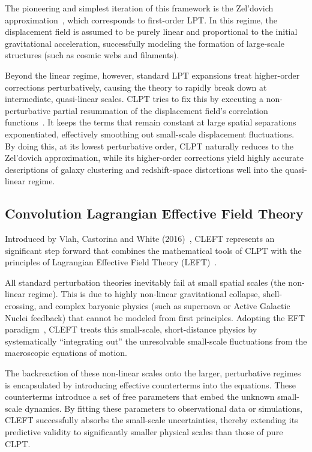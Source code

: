\documentclass[12pt,a4paper,oneside]{report}
\begin{document}
The pioneering and simplest iteration of this framework is the Zel'dovich approximation~\cite{Zeldovich}, which corresponds to first-order LPT. In this regime, the displacement field is assumed to be purely linear and proportional to the initial gravitational acceleration, successfully modeling the formation of large-scale structures (such as cosmic webs and filaments).

Beyond the linear regime, however, standard LPT expansions treat higher-order corrections perturbatively, causing the theory to rapidly break down at intermediate, quasi-linear scales. CLPT tries to fix this by executing a non-perturbative partial resummation of the displacement field's correlation functions~\cite{Matsubara}. It keeps the terms that remain constant at large spatial separations exponentiated, effectively smoothing out small-scale displacement fluctuations. By doing this, at its lowest perturbative order, CLPT naturally reduces to the Zel'dovich approximation, while its higher-order corrections yield highly accurate descriptions of galaxy clustering and redshift-space distortions well into the quasi-linear regime.

\subsection{Convolution Lagrangian Effective Field Theory}\label{subsec:CLEFT}
Introduced by Vlah, Castorina and White (2016)~\cite{CLEFT}, CLEFT represents an significant step forward that combines the mathematical tools of CLPT with the principles of Lagrangian Effective Field Theory (LEFT)~\cite{Porto}.

All standard perturbation theories inevitably fail at small spatial scales (the non-linear regime). This is due to highly non-linear gravitational collapse, shell-crossing, and complex baryonic physics (such as supernova or Active Galactic Nuclei feedback) that cannot be modeled from first principles. Adopting the EFT paradigm~\cite{Baumann}, CLEFT treats this small-scale, short-distance physics by systematically “integrating out” the unresolvable small-scale fluctuations from the macroscopic equations of motion.

The backreaction of these non-linear scales onto the larger, perturbative regimes is encapsulated by introducing effective counterterms into the equations. These counterterms introduce a set of free parameters that embed the unknown small-scale dynamics. By fitting these parameters to observational data or simulations, CLEFT successfully absorbs the small-scale uncertainties, thereby extending its predictive validity to significantly smaller physical scales than those of pure CLPT.
\end{document}
